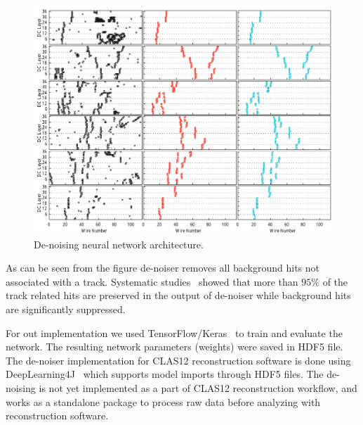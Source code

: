 \begin{figure}[!h]
\begin{center}
 \includegraphics[width=5.8in]{images/cnn_denoise_results.pdf}
\caption {De-noising neural network architecture.}
 \label{network:cnn_results}
 \end{center}
\end{figure}

As can be seen from the figure de-noiser removes all background hits not associated with a track. Systematic studies~\cite{Thomadakis:2022zcd} showed that more than $95\%$ of the track related hits are preserved in the output of de-noiser while background hits are significantly suppressed.

For out implementation we used TensorFlow/Keras~\cite{keras-website} to train and evaluate the network. The resulting network parameters (weights) were saved in HDF5 file. The de-noiser implementation for CLAS12 reconstruction software is done using DeepLearning4J~\cite{dl4j-website} which supports model imports through HDF5 files. The de-noising is not yet implemented as a part of CLAS12 reconstruction workflow, and works as a standalone package to process raw data before analyzing with reconstruction software.
